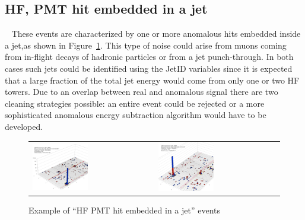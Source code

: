 \subsection{HF, PMT hit embedded in a jet} ~\label{sec:HFHitEmbeddedInJet}
These events are characterized by one or more anomalous hits embedded inside a jet,as shown in 
Figure~\ref{fig:HFhitEmbeddedInJet}. This type of noise could arise from muons coming from 
in-flight decays of hadronic particles or from a jet punch-through. In both cases
such jets could be identified using the JetID variables since it is expected that a large fraction of the
total jet energy would come from only one or two HF towers. Due to an overlap between real and anomalous signal there are
two cleaning strategies possible: an entire event could be rejected or a more sophisticated anomalous energy
subtraction algorithm would have to be developed.
%
\begin{figure}[h]
 \centering
 \begin{tabular}{ll}
   \includegraphics[width=0.47\textwidth]{fig//HFhitInJet.eps} & 
   \includegraphics[width=0.47\textwidth]{fig//HFhitInJet_1.eps} \\
 \end{tabular}
\caption{Example of ``HF PMT hit embedded in a jet'' events}
\label{fig:HFhitEmbeddedInJet}
\end{figure}


